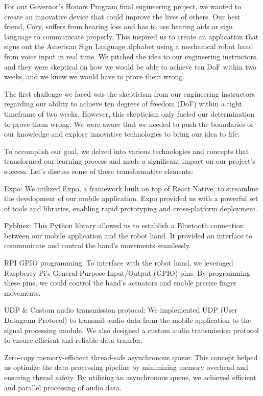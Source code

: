 
For our Governor's Honors Program final engineering project, we wanted to create an innovative device that could improve the lives of others. Our best friend, Cory, suffers from hearing loss and has to use hearing aids or sign language to communicate properly. This inspired us to create an application that signs out the American Sign Language alphabet using a mechanical robot hand from voice input in real time. We pitched the idea to our engineering instructors, and they were skeptical on how we would be able to achieve ten DoF within two weeks, and we knew we would have to prove them wrong. 

The first challenge we faced was the skepticism from our engineering instructors regarding our ability to achieve ten degrees of freedom (DoF) within a tight timeframe of two weeks. However, this skepticism only fueled our determination to prove them wrong. We were aware that we needed to push the boundaries of our knowledge and explore innovative technologies to bring our idea to life.

To accomplish our goal, we delved into various technologies and concepts that transformed our learning process and made a significant impact on our project's success. Let's discuss some of these transformative elements:

Expo: We utilized Expo, a framework built on top of React Native, to streamline the development of our mobile application. Expo provided us with a powerful set of tools and libraries, enabling rapid prototyping and cross-platform deployment.

Pybluez: This Python library allowed us to establish a Bluetooth connection between our mobile application and the robot hand. It provided an interface to communicate and control the hand's movements seamlessly.

RPI GPIO programming: To interface with the robot hand, we leveraged Raspberry Pi's General-Purpose Input/Output (GPIO) pins. By programming these pins, we could control the hand's actuators and enable precise finger movements.

UDP & Custom audio transmission protocol: We implemented UDP (User Datagram Protocol) to transmit audio data from the mobile application to the signal processing module. We also designed a custom audio transmission protocol to ensure efficient and reliable data transfer.

Zero-copy memory-efficient thread-safe asynchronous queue: This concept helped us optimize the data processing pipeline by minimizing memory overhead and ensuring thread safety. By utilizing an asynchronous queue, we achieved efficient and parallel processing of audio data.

